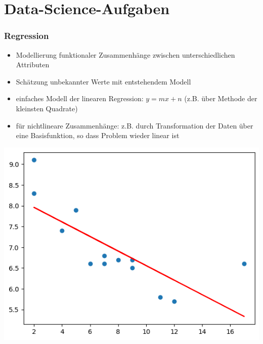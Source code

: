 
\section{Data-Science-Aufgaben}

\begin{frame}
\frametitle{Regression}

\begin{itemize}
\item Modellierung funktionaler Zusammenhänge zwischen unterschiedlichen Attributen
\item Schätzung unbekannter Werte mit entstehendem Modell
\item einfaches Modell der linearen Regression:  $y = mx + n$ (z.B. über Methode der kleinsten Quadrate)
\item für nichtlineare Zusammenhänge: z.B. durch Transformation der Daten über eine Basisfunktion, so dass Problem wieder linear ist
\end{itemize}

\vspace*{-.5cm}
\begin{center}
\includegraphics[scale=0.33]{fig1/linear_regression.png}
\end{center}

\end{frame}


